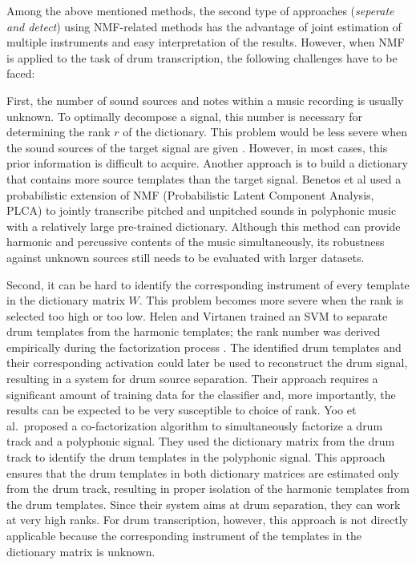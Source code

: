 \documentclass{article}
\begin{document}
Among the above mentioned methods, the second type of approaches (\textit{seperate and detect}) using NMF-related methods has the advantage of joint estimation of multiple instruments and easy interpretation of the results. However, when NMF is applied to the task of drum transcription, the following challenges have to be faced:

First, the number of sound sources and notes within a music recording is usually unknown. To optimally decompose a signal, this number is necessary for determining the rank $r$ of the dictionary. This problem would be less severe when the sound sources of the target signal are given \cite{Lindsay-Smith2012}. However, in most cases, this prior information is difficult to acquire. Another approach is to build a dictionary that contains more source templates than the target signal. Benetos et al used a probabilistic extension of NMF (Probabilistic Latent Component Analysis, PLCA) to jointly transcribe pitched and unpitched sounds in polyphonic music with a relatively large pre-trained dictionary\cite{Benetos2014}. Although this method can provide harmonic and percussive contents of the music simultaneously, its robustness against unknown sources still needs to be evaluated with larger datasets. 

Second, it can be hard to identify the corresponding instrument of every template in the dictionary matrix $W$. This problem becomes more severe when the rank is selected too high or too low. Helen and Virtanen trained an SVM to separate drum templates from the harmonic templates; the rank number was derived empirically during the factorization process \cite{helen_separation_2005}. The identified drum templates and their corresponding activation could later be used to reconstruct the drum signal, resulting in a system for drum source separation. Their approach requires a significant amount of training data for the classifier and, more importantly, the results can be expected to be very susceptible to choice of rank. Yoo et al.\ proposed a co-factorization algorithm \cite{yoo_nonnegative_2010} to simultaneously factorize a drum track and a polyphonic signal. They used the dictionary matrix from the drum track to identify the drum templates in the polyphonic signal. This approach ensures that the drum templates in both dictionary matrices are estimated only from the drum track, resulting in proper isolation of the harmonic templates from the drum templates. Since their system aims at drum separation, they can work at very high ranks. For drum transcription, however, this approach is not directly applicable because the corresponding instrument of the templates in the dictionary matrix is unknown.  
\end{document}
